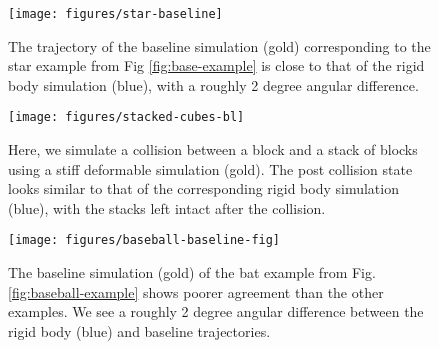 \begin{figure}[t]
	\texttt{[image: figures/star-baseline]}
	\vspace{-0.7cm}
 \caption{The trajectory of the baseline simulation (gold) corresponding to the star example from Fig \ref{fig:base-example} is close to that of the rigid body simulation (blue), with a roughly 2 degree angular difference.} 
	 \label{fig:star-baseline}
\end{figure}

\begin{figure}[t]
	\texttt{[image: figures/stacked-cubes-bl]}
	\vspace{-0.7cm}
 \caption{Here, we simulate a collision between a block and a stack of blocks using a stiff deformable simulation (gold). The post collision state looks similar to that of the corresponding rigid body simulation (blue), with the stacks left intact after the collision.} 
	 \label{fig:stacking-baseline}
\end{figure}

\begin{figure}[t]
	\texttt{[image: figures/baseball-baseline-fig]}
	\vspace{-0.7cm}
 \caption{The baseline simulation (gold) of the bat example from Fig. \ref{fig:baseball-example} shows poorer agreement than the other examples. We see a roughly 2 degree angular difference between the rigid body (blue) and baseline trajectories.}%
	 \label{fig:baseball-baseline}
\end{figure}